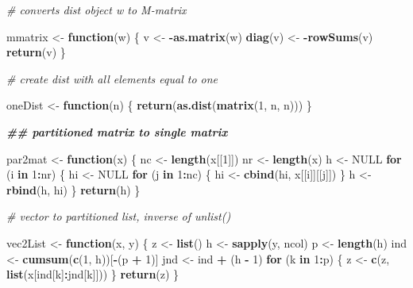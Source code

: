 \documentclass[
  12pt,
]{article}
\newenvironment{Shaded}{\begin{snugshade}}{\end{snugshade}}
\newcommand{\CommentTok}[1]{\textcolor[rgb]{0.56,0.35,0.01}{\textit{#1}}}
\newcommand{\ConstantTok}[1]{\textcolor[rgb]{0.56,0.35,0.01}{#1}}
\newcommand{\ControlFlowTok}[1]{\textcolor[rgb]{0.13,0.29,0.53}{\textbf{#1}}}
\newcommand{\DecValTok}[1]{\textcolor[rgb]{0.00,0.00,0.81}{#1}}
\newcommand{\DocumentationTok}[1]{\textcolor[rgb]{0.56,0.35,0.01}{\textbf{\textit{#1}}}}
\newcommand{\FunctionTok}[1]{\textcolor[rgb]{0.13,0.29,0.53}{\textbf{#1}}}
\newcommand{\NormalTok}[1]{#1}
\newcommand{\OtherTok}[1]{\textcolor[rgb]{0.56,0.35,0.01}{#1}}
\newcommand{\SpecialCharTok}[1]{\textcolor[rgb]{0.81,0.36,0.00}{\textbf{#1}}}
\begin{document}
\begin{Shaded}
\begin{Highlighting}[]
\CommentTok{\# converts dist object w to M{-}matrix}

\NormalTok{mmatrix }\OtherTok{\textless{}{-}} \ControlFlowTok{function}\NormalTok{(w) \{}
\NormalTok{  v }\OtherTok{\textless{}{-}} \SpecialCharTok{{-}}\FunctionTok{as.matrix}\NormalTok{(w)}
  \FunctionTok{diag}\NormalTok{(v) }\OtherTok{\textless{}{-}} \SpecialCharTok{{-}}\FunctionTok{rowSums}\NormalTok{(v)}
  \FunctionTok{return}\NormalTok{(v)}
\NormalTok{\}}

\CommentTok{\# create dist with all elements equal to one}

\NormalTok{oneDist }\OtherTok{\textless{}{-}} \ControlFlowTok{function}\NormalTok{(n) \{}
  \FunctionTok{return}\NormalTok{(}\FunctionTok{as.dist}\NormalTok{(}\FunctionTok{matrix}\NormalTok{(}\DecValTok{1}\NormalTok{, n, n)))}
\NormalTok{\}}

\DocumentationTok{\#\# partitioned matrix to single matrix}

\NormalTok{par2mat }\OtherTok{\textless{}{-}} \ControlFlowTok{function}\NormalTok{(x) \{}
\NormalTok{  nc }\OtherTok{\textless{}{-}} \FunctionTok{length}\NormalTok{(x[[}\DecValTok{1}\NormalTok{]])}
\NormalTok{  nr }\OtherTok{\textless{}{-}} \FunctionTok{length}\NormalTok{(x)}
\NormalTok{  h }\OtherTok{\textless{}{-}} \ConstantTok{NULL}
  \ControlFlowTok{for}\NormalTok{ (i }\ControlFlowTok{in} \DecValTok{1}\SpecialCharTok{:}\NormalTok{nr) \{}
\NormalTok{    hi }\OtherTok{\textless{}{-}} \ConstantTok{NULL}
    \ControlFlowTok{for}\NormalTok{ (j }\ControlFlowTok{in} \DecValTok{1}\SpecialCharTok{:}\NormalTok{nc) \{}
\NormalTok{      hi }\OtherTok{\textless{}{-}} \FunctionTok{cbind}\NormalTok{(hi, x[[i]][[j]])}
\NormalTok{    \}}
\NormalTok{    h }\OtherTok{\textless{}{-}} \FunctionTok{rbind}\NormalTok{(h, hi)}
\NormalTok{  \}}
  \FunctionTok{return}\NormalTok{(h)}
\NormalTok{\}}

\CommentTok{\# vector to partitioned list, inverse of unlist()}

\NormalTok{vec2List }\OtherTok{\textless{}{-}} \ControlFlowTok{function}\NormalTok{(x, y) \{}
\NormalTok{  z }\OtherTok{\textless{}{-}} \FunctionTok{list}\NormalTok{()}
\NormalTok{  h }\OtherTok{\textless{}{-}} \FunctionTok{sapply}\NormalTok{(y, ncol)}
\NormalTok{  p }\OtherTok{\textless{}{-}} \FunctionTok{length}\NormalTok{(h)}
\NormalTok{  ind }\OtherTok{\textless{}{-}} \FunctionTok{cumsum}\NormalTok{(}\FunctionTok{c}\NormalTok{(}\DecValTok{1}\NormalTok{, h))[}\SpecialCharTok{{-}}\NormalTok{(p }\SpecialCharTok{+} \DecValTok{1}\NormalTok{)]}
\NormalTok{  jnd }\OtherTok{\textless{}{-}}\NormalTok{ ind }\SpecialCharTok{+}\NormalTok{ (h }\SpecialCharTok{{-}} \DecValTok{1}\NormalTok{)}
  \ControlFlowTok{for}\NormalTok{ (k }\ControlFlowTok{in} \DecValTok{1}\SpecialCharTok{:}\NormalTok{p) \{}
\NormalTok{    z }\OtherTok{\textless{}{-}} \FunctionTok{c}\NormalTok{(z, }\FunctionTok{list}\NormalTok{(x[ind[k]}\SpecialCharTok{:}\NormalTok{jnd[k]]))}
\NormalTok{  \}}
  \FunctionTok{return}\NormalTok{(z)}
\NormalTok{\}}


\end{Highlighting}
\end{Shaded}
\end{document}
